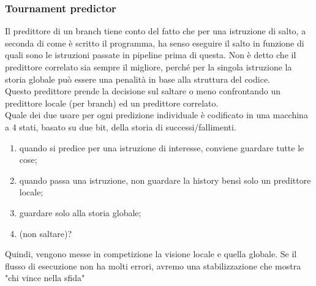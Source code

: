\documentclass[12pt, oneside]{extbook}
\begin{document}
\subsubsection{Tournament predictor}
Il predittore di un branch tiene conto del fatto che per una istruzione di salto, a seconda di come è scritto il programma, ha senso eseguire il salto in funzione di quali sono le istruzioni passate in pipeline prima di questa. Non è detto che il predittore correlato sia sempre il migliore, perché per la singola istruzione la storia globale può essere una penalità in base alla struttura del codice.\\ Questo predittore prende la decisione sul saltare o meno confrontando un predittore locale (per branch) ed un predittore correlato.\\Quale dei due usare per ogni predizione individuale è codificato in una macchina a 4 stati, basato su due bit, della storia di successi/fallimenti.
\begin{enumerate}
\item quando si predice per una istruzione di interesse, conviene guardare tutte le cose;
\item quando passa una istruzione, non guardare la history bensì solo un predittore locale;
\item guardare solo alla storia globale;
\item (non saltare)?
\end{enumerate}
Quindi, vengono messe in competizione la visione locale e quella globale. Se il flusso di esecuzione non ha molti errori, avremo una stabilizzazione che mostra "chi vince nella sfida"
\end{document}
